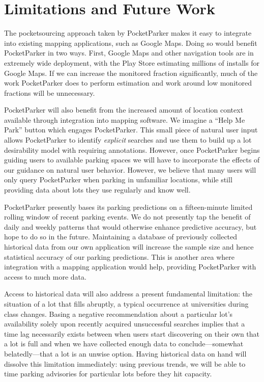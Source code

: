 \section{Limitations and Future Work}
\label{sec-future}

The pocketsourcing approach taken by PocketParker makes it easy to integrate
into existing mapping applications, such as Google Maps. Doing so would
benefit PocketParker in two ways. First, Google Maps and other navigation
tools are in extremely wide deployment, with the Play Store estimating
millions of installs for Google Maps. If we can increase the monitored
fraction significantly, much of the work PocketParker does to perform
estimation and work around low monitored fractions will be unnecessary.

PocketParker will also benefit from the increased amount of location context
available through integration into mapping software. We imagine a ``Help Me
Park'' button which engages PocketParker. This small piece of natural user
input allows PocketParker to identify \textit{explicit} searches and use them
to build up a lot desirability model with requiring annotations. However,
once PocketParker begins guiding users to available parking spaces we will
have to incorporate the effects of our guidance on natural user behavior.
However, we believe that many users will only query PocketParker when parking
in unfamiliar locations, while still providing data about lots they use
regularly and know well.

PocketParker presently bases its parking predictions on a fifteen-minute
limited rolling window of recent parking events. We do not presently tap the
benefit of daily and weekly patterns that would otherwise enhance predictive
accuracy, but hope to do so in the future. Maintaining a database of
previously collected historical data from our own application will increase
the sample size and hence statistical accuracy of our parking predictions.
This is another area where integration with a mapping application would help,
providing PocketParker with access to much more data.

Access to historical data will also address a present fundamental limitation:
the situation of a lot that fills abruptly, a typical occurrence at
universities during class changes. Basing a negative recommendation about a
particular lot's availability solely upon recently acquired unsuccessful
searches implies that a time lag necessarily exists between when users start
discovering on their own that a lot is full and when we have collected enough
data to conclude---somewhat belatedly---that a lot is an unwise option.
Having historical data on hand will dissolve this limitation immediately:
using previous trends, we will be able to time parking advisories for
particular lots before they hit capacity.

